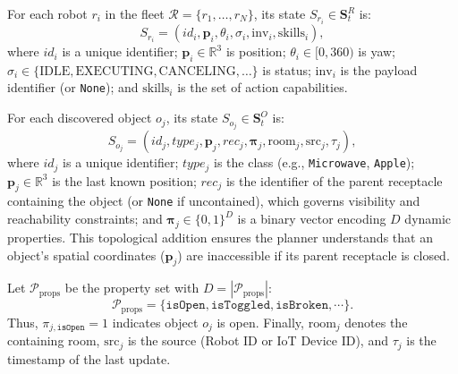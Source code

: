 For each robot $r_i$ in the fleet $\mathcal{R}=\{r_1,\dots,r_N\}$, its state $S_{r_i}\in \mathbf{S}^R_t$ is:
\begin{equation}
\label{eq:robot_state}
S_{r_i} = (id_i, \mathbf{p}_i, \theta_i, \sigma_i, \text{inv}_i, \text{skills}_i),
\end{equation}
where $id_i$ is a unique identifier; $\mathbf{p}_i\in \mathbb{R}^3$ is position; $\theta_i\in [0,360)$ is yaw; $\sigma_i\in\{\text{IDLE},\text{EXECUTING},\text{CANCELING},\dots\}$ is status; $\text{inv}_i$ is the payload identifier (or \texttt{None}); and $\text{skills}_i$ is the set of action capabilities.

For each discovered object $o_j$, its state $S_{o_j}\in \mathbf{S}^O_t$ is:
\begin{equation}
\label{eq:object_state}
S_{o_j}=(id_j,type_j,\mathbf{p}_j,rec_j,\boldsymbol{\pi}_j,\text{room}_j,\text{src}_j,\tau_j),
\end{equation}
where $id_j$ is a unique identifier; $type_j$ is the class (e.g., \texttt{Microwave}, \texttt{Apple}); $\mathbf{p}_j\in\mathbb{R}^3$ is the last known position; $rec_j$ is the identifier of the parent receptacle containing the object (or \texttt{None} if uncontained), which governs visibility and reachability constraints; and $\boldsymbol{\pi}_j\in\{0,1\}^D$ is a binary vector encoding $D$ dynamic properties. This topological addition ensures the planner understands that an object's spatial coordinates ($\mathbf{p}_j$) are inaccessible if its parent receptacle is closed. 

Let $\mathcal{P}_{\text{props}}$ be the property set with $D=|\mathcal{P}_{\text{props}}|$:
\begin{equation}
\label{eq:props}
\mathcal{P}_{\text{props}} = \{\texttt{isOpen}, \texttt{isToggled}, \texttt{isBroken}, \cdots \}.
\end{equation}
Thus, $\pi_{j,\texttt{isOpen}}=1$ indicates object $o_j$ is open. Finally, $\text{room}_j$ denotes the containing room, $\text{src}_j$ is the source (Robot ID or IoT Device ID), and $\tau_j$ is the timestamp of the last update.


